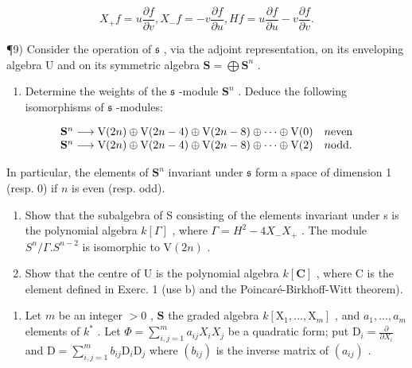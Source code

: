 \[
X _ {+} f = u \frac {\partial f}{\partial v}, X _ {-} f = - v \frac {\partial f}{\partial u}, H f = u \frac {\partial f}{\partial u} - v \frac {\partial f}{\partial v}.
\]

¶9) Consider the operation of \(\mathfrak{s}\) , via the adjoint representation, on its enveloping algebra U and on its symmetric algebra \(\mathbf{S} = \bigoplus \mathbf{S}^n\) .

\begin{enumerate}
\def\labelenumi{\alph{enumi})}
\tightlist
\item
  Determine the weights of the \(\mathfrak{s}\) -module \(\mathbf{S}^n\) . Deduce the following isomorphisms of \(\mathfrak{s}\) -modules:
\end{enumerate}

\[
\begin{array}{l l} \mathbf {S} ^ {n} \longrightarrow \mathrm{V} (2 n) \oplus \mathrm{V} (2 n - 4) \oplus \mathrm{V} (2 n - 8) \oplus \dots \oplus \mathrm{V} (0) & n \text {even} \\ \mathbf {S} ^ {n} \longrightarrow \mathrm{V} (2 n) \oplus \mathrm{V} (2 n - 4) \oplus \mathrm{V} (2 n - 8) \oplus \dots \oplus \mathrm{V} (2) & n \text {odd}. \end{array}
\]

In particular, the elements of \(\mathbf{S}^n\) invariant under \(\mathfrak{s}\) form a space of dimension 1 (resp. 0) if \(n\) is even (resp. odd).

\begin{enumerate}
\def\labelenumi{\alph{enumi})}
\setcounter{enumi}{1}
\item
  Show that the subalgebra of S consisting of the elements invariant under s is the polynomial algebra \(k[\Gamma]\) , where \(\Gamma = H^{2} - 4X_{-}X_{+}\) . The module \(S^{n}/\Gamma.S^{n-2}\) is isomorphic to \(\mathrm{V}(2n)\) .
\item
  Show that the centre of U is the polynomial algebra \(k[\mathbf{C}]\) , where C is the element defined in Exerc. 1 (use b) and the Poincaré-Birkhoff-Witt theorem).
\end{enumerate}

\begin{enumerate}
\def\labelenumi{\arabic{enumi})}
\setcounter{enumi}{9}
\tightlist
\item
  Let \(m\) be an integer \(> 0\) , \(\mathbf{S}\) the graded algebra \(k[\mathrm{X}_1, \ldots, \mathrm{X}_m]\) , and \(a_1, \ldots, a_m\) elements of \(k^*\) . Let \(\Phi = \sum_{i,j=1}^{m} a_{ij} X_i X_j\) be a quadratic form; put \(\mathrm{D}_i = \frac{\partial}{\partial X_i}\) and \(\mathrm{D} = \sum_{i,j=1}^{m} b_{ij} \mathrm{D}_i \mathrm{D}_j\) where \((b_{ij})\) is the inverse matrix of \((a_{ij})\) .
\end{enumerate}

